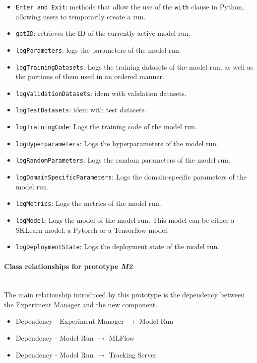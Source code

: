 \begin{itemize}
    \item \texttt{Enter and Exit}: methods that allow the use of the \texttt{with} clause in Python, allowing users to temporarily create a run.
    \item \texttt{getID}: retrieves the ID of the currently active model run.
    \item \texttt{logParameters}: logs the parameters of the model run.
    \item \texttt{logTrainingDatasets}: Logs the training datasets of the model run, as well as the portions of them used in an ordered manner.
    \item \texttt{logValidationDatasets}: idem with validation datasets.
    \item \texttt{logTestDatasets}: idem with test datasets.
    \item \texttt{logTrainingCode}: Logs the training code of the model run.
    \item \texttt{logHyperparameters}: Logs the hyperparameters of the model run.
    \item \texttt{logRandomParameters}: Logs the random parameters of the model run.
    \item \texttt{logDomainSpecificParameters}: Logs the domain-specific parameters of the model run.
    \item \texttt{logMetrics}: Logs the metrics of the model run.
    \item \texttt{logModel}: Logs the model of the model run. This model can be either a SKLearn model, a Pytorch or a Tensorflow model.
    \item \texttt{logDeploymentState}: Logs the deployment state of the model run.
\end{itemize}

\paragraph{Class relationships for prototype \emph{M2}} \mbox{}\\

The main relationship introduced by this prototype is the dependency between the Experiment Manager and the new component.

\begin{itemize}
    \item Dependency - Experiment Manager $\rightarrow$ Model Run
    \item Dependency - Model Run $\rightarrow$ MLFlow
    \item Dependency - Model Run $\rightarrow$ Tracking Server
\end{itemize}

